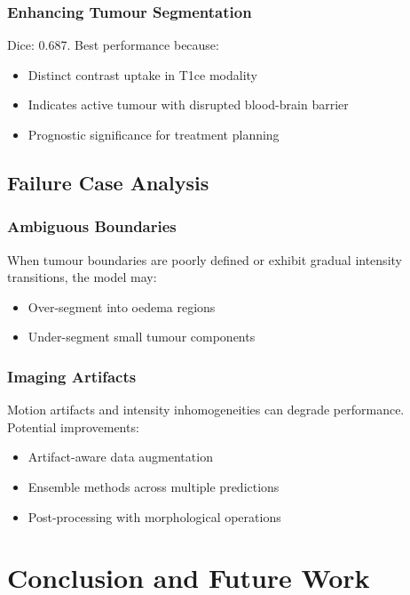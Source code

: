 \documentclass{ecsproject}     %
\begin{document}
\subsection{Enhancing Tumour Segmentation}

Dice: 0.687. Best performance because:
\begin{itemize}
    \item Distinct contrast uptake in T1ce modality
    \item Indicates active tumour with disrupted blood-brain barrier
    \item Prognostic significance for treatment planning
\end{itemize}

\section{Failure Case Analysis}

\subsection{Ambiguous Boundaries}

When tumour boundaries are poorly defined or exhibit gradual intensity transitions, the model may:
\begin{itemize}
    \item Over-segment into oedema regions
    \item Under-segment small tumour components
\end{itemize}

\subsection{Imaging Artifacts}

Motion artifacts and intensity inhomogeneities can degrade performance. Potential improvements:
\begin{itemize}
    \item Artifact-aware data augmentation
    \item Ensemble methods across multiple predictions
    \item Post-processing with morphological operations
\end{itemize}


\chapter{Conclusion and Future Work} \label{Chapter:Conclusion}
\end{document}
